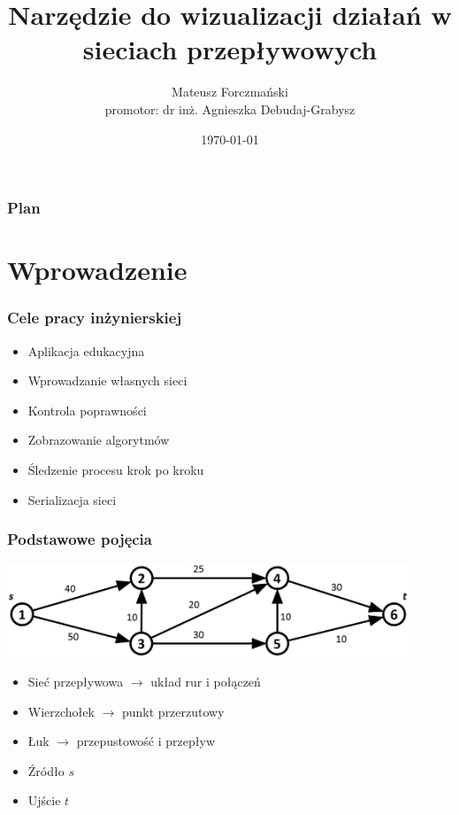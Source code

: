 \documentclass{beamer}
\begin{document}
\title[]%
{Narzędzie do wizualizacji działań w sieciach przepływowych} %
\author[ ]{Mateusz Forczmański\\promotor: dr inż. Agnieszka Debudaj-Grabysz}

\ifpdf
{}
\fi

\date{\today}


\subject{Narzędzie do wizualizacji działań w sieciach przepływowych}

\begin{frame}%
        \titlepage
\end{frame}

\begin{frame}
	\frametitle{Plan}
   \tableofcontents[hideallsubsections]
\end{frame}

\section{Wprowadzenie}
\begin{frame}[<+(1)->]\frametitle{Cele pracy inżynierskiej}
	\begin{itemize}
		\item Aplikacja edukacyjna
		\item Wprowadzanie własnych sieci
		\item Kontrola poprawności
		\item Zobrazowanie algorytmów
		\item Śledzenie procesu krok po kroku
		\item Serializacja sieci
	\end{itemize}	
\end{frame}
\begin{frame}\frametitle{Podstawowe pojęcia}
	\begin{center}
		\includegraphics[width=0.9\textwidth]{./img/siec05}
	\end{center}
\begin{itemize}
\item Sieć przepływowa $ \rightarrow $ układ rur i połączeń
\item Wierzchołek $ \rightarrow $ punkt przerzutowy
\item Łuk $ \rightarrow $ przepustowość i przepływ
\item Źródło $ s $
\item Ujście $ t $
\end{itemize}	
\end{frame}
\end{document}
